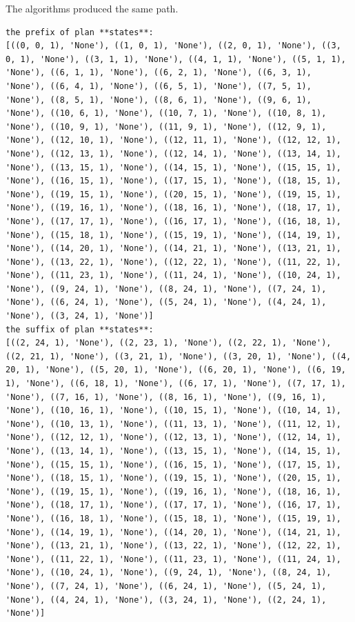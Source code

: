 The algorithms produced the same path. 
\begin{lstlisting}
the prefix of plan **states**:
[((0, 0, 1), 'None'), ((1, 0, 1), 'None'), ((2, 0, 1), 'None'), ((3, 0, 1), 'None'), ((3, 1, 1), 'None'), ((4, 1, 1), 'None'), ((5, 1, 1), 'None'), ((6, 1, 1), 'None'), ((6, 2, 1), 'None'), ((6, 3, 1), 'None'), ((6, 4, 1), 'None'), ((6, 5, 1), 'None'), ((7, 5, 1), 'None'), ((8, 5, 1), 'None'), ((8, 6, 1), 'None'), ((9, 6, 1), 'None'), ((10, 6, 1), 'None'), ((10, 7, 1), 'None'), ((10, 8, 1), 'None'), ((10, 9, 1), 'None'), ((11, 9, 1), 'None'), ((12, 9, 1), 'None'), ((12, 10, 1), 'None'), ((12, 11, 1), 'None'), ((12, 12, 1), 'None'), ((12, 13, 1), 'None'), ((12, 14, 1), 'None'), ((13, 14, 1), 'None'), ((13, 15, 1), 'None'), ((14, 15, 1), 'None'), ((15, 15, 1), 'None'), ((16, 15, 1), 'None'), ((17, 15, 1), 'None'), ((18, 15, 1), 'None'), ((19, 15, 1), 'None'), ((20, 15, 1), 'None'), ((19, 15, 1), 'None'), ((19, 16, 1), 'None'), ((18, 16, 1), 'None'), ((18, 17, 1), 'None'), ((17, 17, 1), 'None'), ((16, 17, 1), 'None'), ((16, 18, 1), 'None'), ((15, 18, 1), 'None'), ((15, 19, 1), 'None'), ((14, 19, 1), 'None'), ((14, 20, 1), 'None'), ((14, 21, 1), 'None'), ((13, 21, 1), 'None'), ((13, 22, 1), 'None'), ((12, 22, 1), 'None'), ((11, 22, 1), 'None'), ((11, 23, 1), 'None'), ((11, 24, 1), 'None'), ((10, 24, 1), 'None'), ((9, 24, 1), 'None'), ((8, 24, 1), 'None'), ((7, 24, 1), 'None'), ((6, 24, 1), 'None'), ((5, 24, 1), 'None'), ((4, 24, 1), 'None'), ((3, 24, 1), 'None')]
the suffix of plan **states**:
[((2, 24, 1), 'None'), ((2, 23, 1), 'None'), ((2, 22, 1), 'None'), ((2, 21, 1), 'None'), ((3, 21, 1), 'None'), ((3, 20, 1), 'None'), ((4, 20, 1), 'None'), ((5, 20, 1), 'None'), ((6, 20, 1), 'None'), ((6, 19, 1), 'None'), ((6, 18, 1), 'None'), ((6, 17, 1), 'None'), ((7, 17, 1), 'None'), ((7, 16, 1), 'None'), ((8, 16, 1), 'None'), ((9, 16, 1), 'None'), ((10, 16, 1), 'None'), ((10, 15, 1), 'None'), ((10, 14, 1), 'None'), ((10, 13, 1), 'None'), ((11, 13, 1), 'None'), ((11, 12, 1), 'None'), ((12, 12, 1), 'None'), ((12, 13, 1), 'None'), ((12, 14, 1), 'None'), ((13, 14, 1), 'None'), ((13, 15, 1), 'None'), ((14, 15, 1), 'None'), ((15, 15, 1), 'None'), ((16, 15, 1), 'None'), ((17, 15, 1), 'None'), ((18, 15, 1), 'None'), ((19, 15, 1), 'None'), ((20, 15, 1), 'None'), ((19, 15, 1), 'None'), ((19, 16, 1), 'None'), ((18, 16, 1), 'None'), ((18, 17, 1), 'None'), ((17, 17, 1), 'None'), ((16, 17, 1), 'None'), ((16, 18, 1), 'None'), ((15, 18, 1), 'None'), ((15, 19, 1), 'None'), ((14, 19, 1), 'None'), ((14, 20, 1), 'None'), ((14, 21, 1), 'None'), ((13, 21, 1), 'None'), ((13, 22, 1), 'None'), ((12, 22, 1), 'None'), ((11, 22, 1), 'None'), ((11, 23, 1), 'None'), ((11, 24, 1), 'None'), ((10, 24, 1), 'None'), ((9, 24, 1), 'None'), ((8, 24, 1), 'None'), ((7, 24, 1), 'None'), ((6, 24, 1), 'None'), ((5, 24, 1), 'None'), ((4, 24, 1), 'None'), ((3, 24, 1), 'None'), ((2, 24, 1), 'None')]

\end{lstlisting}
